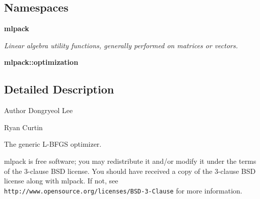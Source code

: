 \subsection*{Namespaces}
\begin{DoxyCompactItemize}
\item 
 {\bf mlpack}
\begin{DoxyCompactList}\small\item\em Linear algebra utility functions, generally performed on matrices or vectors. \end{DoxyCompactList}\item 
 {\bf mlpack\+::optimization}
\end{DoxyCompactItemize}


\subsection{Detailed Description}
\begin{DoxyAuthor}{Author}
Dongryeol Lee 

Ryan Curtin
\end{DoxyAuthor}
The generic L-\/\+B\+F\+GS optimizer.

mlpack is free software; you may redistribute it and/or modify it under the terms of the 3-\/clause B\+SD license. You should have received a copy of the 3-\/clause B\+SD license along with mlpack. If not, see {\tt http\+://www.\+opensource.\+org/licenses/\+B\+S\+D-\/3-\/\+Clause} for more information. 